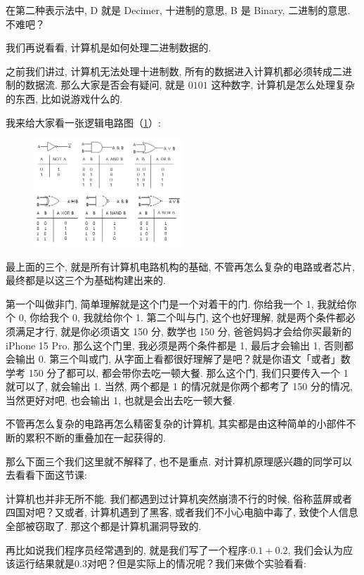 在第二种表示法中, D 就是 Decimer, 十进制的意思, B 是 Binary, 二进制的意思. 不难吧？

我们再说看看, 计算机是如何处理二进制数据的. 

之前我们讲过, 计算机无法处理十进制数, 所有的数据进入计算机都必须转成二进制的数据流. 那么大家是否会有疑问, 就是 $0101$ 这种数字, 计算机是怎么处理复杂的东西, 比如说游戏什么的. 

我来给大家看一张逻辑电路图（\ref{fig:img2_14}）:

\begin{figure}[ht]
  \centering\includegraphics[width=0.5\textwidth]{asset/975a7883-49a7-4b15-8102-0352aebc5568.png}
  \caption{}
  \label{fig:img2_14}
\end{figure}

最上面的三个, 就是所有计算机电路机构的基础, 不管再怎么复杂的电路或者芯片, 最终都是以这三个为基础构建出来的. 

第一个叫做非门, 简单理解就是这个门是一个对着干的门. 你给我一个 1, 我就给你个 0, 你给我个 0, 我就给你个 1. 
第二个叫与门, 这个也好理解, 就是两个条件都必须满足才行, 就是你必须语文 150 分, 数学也 150 分, 爸爸妈妈才会给你买最新的 iPhone 15 Pro. 那么这个门里, 我必须是两个条件都是 1, 最后才会输出 1, 否则都会输出 0.
第三个叫或门, 从字面上看都很好理解了是吧？就是你语文「或者」数学考 150 分了都可以, 都会带你去吃一顿大餐. 那么这个门, 我们只要传入一个 1 就可以了, 就会输出 1. 当然, 两个都是 1 的情况就是你两个都考了 150 分的情况, 当然更好对吧, 也会输出 1, 也就是会出去吃一顿大餐. 

不管再怎么复杂的电路再怎么精密复杂的计算机, 其实都是由这种简单的小部件不断的累积不断的重叠加在一起获得的. 

那么下面三个我们这里就不解释了, 也不是重点. 对计算机原理感兴趣的同学可以去看看下面这节课:

计算机也并非无所不能. 我们都遇到过计算机突然崩溃不行的时候, 俗称蓝屏或者四国对吧？又或者, 计算机遇到了黑客, 或者我们不小心电脑中毒了, 致使个人信息全部被窃取了. 那这个都是计算机漏洞导致的. 

再比如说我们程序员经常遇到的, 就是我们写了一个程序:$0.1+0.2$, 我们会认为应该运行结果就是$0.3$对吧？但是实际上的情况呢？我们来做个实验看看:

